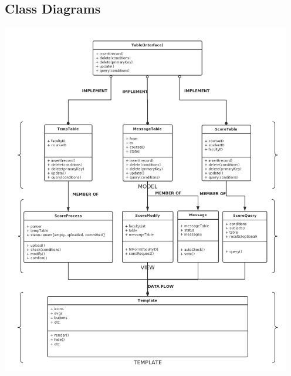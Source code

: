 \documentclass[a4]{article}
\begin{document}
\subsection{Class Diagrams}
\includegraphics[width=5in]{pic/4.png}
\end{document}
